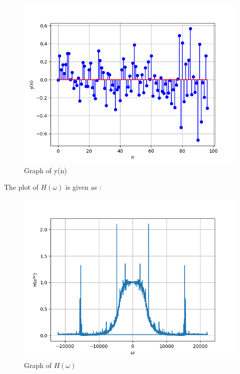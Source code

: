 \documentclass[journal,12pt,twocolumn]{IEEEtran}
\theoremstyle{remark}
\begin{document}
\begin{figure}[!h] 
\centering
\includegraphics[width=\columnwidth]{figs/y(n).png}
\caption{Graph of y(n)}
\end{figure}
\newpage

The plot of $H(\omega)$ is given as :
\begin{figure}[!h] 
\centering
\includegraphics[width=\columnwidth]{figs/H(w).png}
\caption{Graph of $H(\omega)$}
\end{figure}
\end{document}
